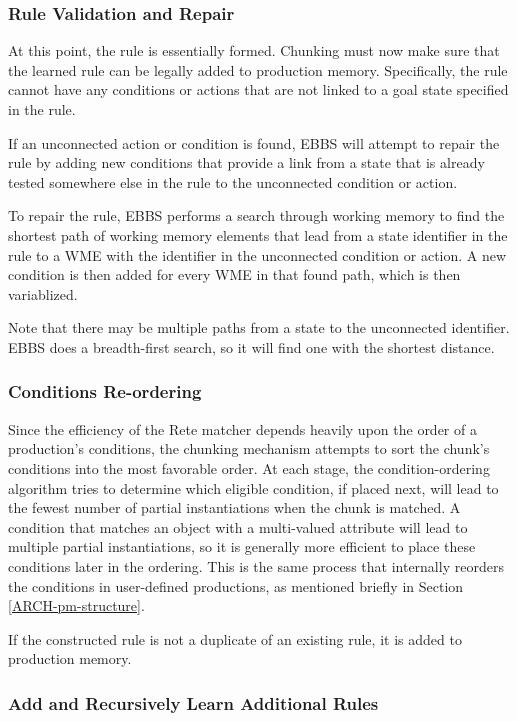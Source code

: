 \subsubsection{Rule Validation and Repair}
\label{CHUNKING-repair}
At this point, the rule is essentially formed.  Chunking must now make sure that the learned rule can be legally added to production memory.  Specifically, the rule cannot have any conditions or actions that are not linked to a goal state specified in the rule.

If an unconnected action or condition is found, EBBS will attempt to repair the rule by adding new conditions that provide a link from a state that is already tested somewhere else in the rule to the unconnected condition or action.

To repair the rule, EBBS performs a search through working memory to find the shortest path of working memory elements that lead from a state identifier in the rule to a WME with the identifier in the unconnected condition or action.  A new condition is then added for every WME in that found path, which is then variablized.

Note that there may be multiple paths from a state to the unconnected identifier.  EBBS does a breadth-first search, so it will find one with the shortest distance.

\subsubsection{Conditions Re-ordering}

Since the efficiency of the Rete matcher depends heavily upon the order of a production's conditions, the chunking mechanism attempts to sort the chunk's conditions into the most favorable order. At each stage, the condition-ordering algorithm tries to determine which eligible condition, if placed next, will lead to the fewest number of partial instantiations when the chunk is matched. A condition that matches an object with a multi-valued attribute will lead to multiple partial instantiations, so it is generally more efficient to place these conditions later in the ordering.  This is the same process that internally reorders the conditions in user-defined productions, as mentioned briefly in Section \ref{ARCH-pm-structure}.

If the constructed rule is not a duplicate of an existing rule, it is added to production memory.

\subsubsection{Add and Recursively Learn Additional Rules}

